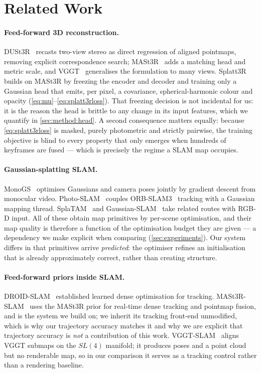 \section{Related Work}
\label{sec:related}

\paragraph{Feed-forward 3D reconstruction.}
DUSt3R~\cite{wang2024dust3r} recasts two-view stereo as direct regression of
aligned pointmaps, removing explicit correspondence search;
MASt3R~\cite{leroy2024mast3r} adds a matching head and metric scale, and
VGGT~\cite{wang2025vggt} generalises the formulation to many views.
Splatt3R~\cite{smart2024splatt3r} builds on MASt3R by freezing the encoder and
decoder and training only a Gaussian head that emits, per pixel, a covariance,
spherical-harmonic colour and opacity (\cref{eq:mu}--\cref{eq:splatt3rloss}).
That freezing decision is not incidental for us: it is the reason the head is
brittle to any change in its input features, which we quantify in
\cref{sec:method:head}. A second consequence matters equally: because
\cref{eq:splatt3rloss} is masked, purely photometric and strictly pairwise, the
training objective is blind to every property that only emerges when hundreds
of keyframes are fused --- which is precisely the regime a SLAM map occupies.

\paragraph{Gaussian-splatting SLAM.}
MonoGS~\cite{matsuki2024monogs} optimises Gaussians and camera poses jointly by
gradient descent from monocular video. Photo-SLAM~\cite{huang2024photoslam}
couples ORB-SLAM3~\cite{campos2021orbslam3} tracking with a
Gaussian mapping thread. SplaTAM~\cite{keetha2024splatam} and
Gaussian-SLAM~\cite{yugay2023gaussianslam} take related routes with RGB-D
input. All of these obtain map primitives by per-scene optimisation, and their
map quality is therefore a function of the optimisation budget they are given
--- a dependency we make explicit when comparing
(\cref{sec:experiments}). Our system differs in that primitives arrive
\emph{predicted}: the optimiser refines an initialisation that is already
approximately correct, rather than creating structure.

\paragraph{Feed-forward priors inside SLAM.}
DROID-SLAM~\cite{teed2021droidslam} established learned dense optimisation for
tracking. MASt3R-SLAM~\cite{murai2025mast3rslam} uses the MASt3R prior for
real-time dense tracking and pointmap fusion, and is the system we build on;
we inherit its tracking front-end unmodified, which is why our trajectory
accuracy matches it and why we are explicit that trajectory accuracy is
\emph{not} a contribution of this work.
VGGT-SLAM~\cite{maggio2025vggtslam} aligns VGGT submaps on the $SL(4)$
manifold; it produces poses and a point cloud but no renderable map, so in our
comparison it serves as a tracking control rather than a rendering baseline.

